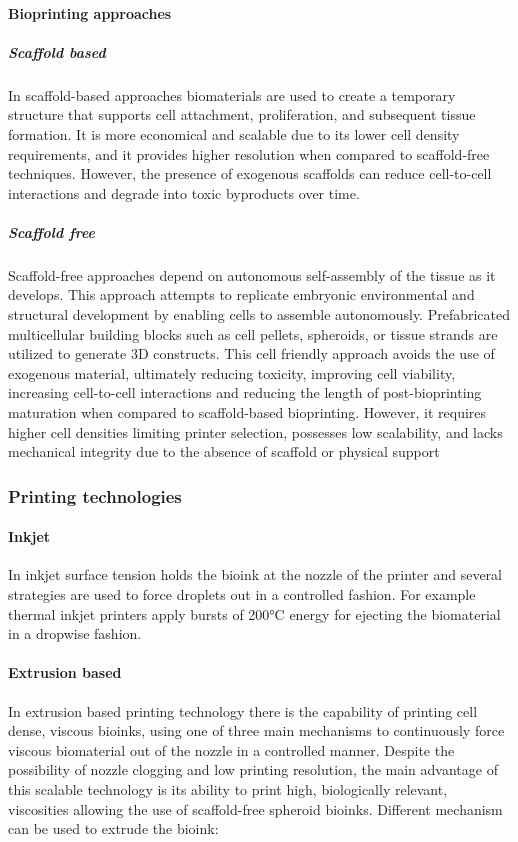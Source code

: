 			\paragraph{Bioprinting approaches}

				\subparagraph{Scaffold based}
				In scaffold-based approaches biomaterials are used to create a temporary structure that supports cell attachment, proliferation, and subsequent tissue formation.
				It is more economical and scalable due to its lower cell density requirements, and it provides higher resolution when compared to scaffold-free techniques.
				However, the presence of exogenous scaffolds can reduce cell-to-cell interactions and degrade into toxic byproducts over time.

				\subparagraph{Scaffold free}
				Scaffold-free approaches depend on autonomous self-assembly of the tissue as it develops.
				This approach attempts to replicate embryonic environmental and structural development by enabling cells to assemble autonomously.
				Prefabricated multicellular building blocks such as cell pellets, spheroids, or tissue strands are utilized to generate 3D constructs.
				This cell friendly approach avoids the use of exogenous material, ultimately reducing toxicity, improving cell viability, increasing cell-to-cell interactions and reducing the length of post-bioprinting maturation when compared to scaffold-based bioprinting.
				However, it requires higher cell densities limiting printer selection, possesses low scalability, and lacks mechanical integrity due to the absence of scaffold or physical support

		\subsubsection{Printing technologies}

			\paragraph{Inkjet}
			In inkjet surface tension holds the bioink at the nozzle of the printer and several strategies are used to force droplets out in a controlled fashion.
			For example thermal inkjet printers apply bursts of 200°C energy for ejecting the biomaterial in a dropwise fashion.

			\paragraph{Extrusion based}
			In extrusion based printing technology there is the capability of printing cell dense, viscous bioinks, using one of three main mechanisms to continuously force viscous biomaterial out of the nozzle in a controlled manner.
			Despite the possibility of nozzle clogging and low printing resolution, the main advantage of this scalable technology is its ability to print high, biologically relevant, viscosities allowing the use of scaffold-free spheroid bioinks.
			Different mechanism can be used to extrude the bioink:

